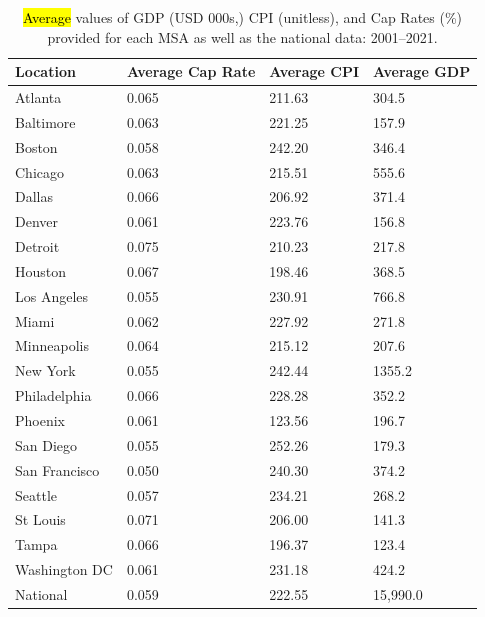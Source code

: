 \documentclass[jrfm,article,accept,oneauthor,pdftex]{Definitions/mdpi}
\begin{document}
\begin{table}[H]
 \tabcolsep=0.54cm
  \caption{\hl{Average} %
 values of GDP (USD  000s,) CPI (unitless), and Cap Rates (\%) provided for each MSA as well as the national data: 2001--2021.}
    \begin{tabular}{llll}
    \toprule
    \textbf{Location} & \textbf{Average Cap Rate} &\textbf{Average CPI} &\textbf{Average GDP}          \\
    \midrule
    Atlanta &0.065 &211.63 &304.5         \\
    Baltimore &0.063 &221.25& 157.9          \\
    Boston &0.058& 242.20& 346.4          \\
    Chicago& 0.063& 215.51 &555.6          \\
    Dallas& 0.066& 206.92&371.4        \\
    Denver& 0.061 &223.76 &156.8          \\
    Detroit &0.075 &210.23& 217.8          \\
    Houston &0.067 &198.46 &368.5          \\
    Los Angeles& 0.055 &230.91 &766.8          \\
    Miami &0.062 &227.92& 271.8          \\
    Minneapolis& 0.064 &215.12 &207.6          \\
    New York &0.055& 242.44& 1355.2          \\
    Philadelphia &0.066 &228.28& 352.2          \\
    Phoenix& 0.061 &123.56& 196.7          \\
    San Diego& 0.055& 252.26 &179.3          \\
    San Francisco& 0.050 &240.30&374.2         \\
    Seattle &0.057 &234.21 &268.2          \\
    St Louis &0.071 &206.00& 141.3          \\
    Tampa& 0.066& 196.37 &123.4          \\
    Washington DC& 0.061 &231.18 &424.2          \\
    National&0.059& 222.55& 15,990.0       \\
    \bottomrule
    \end{tabular}%
  \label{tab1}%
\end{table}%


\end{document}
